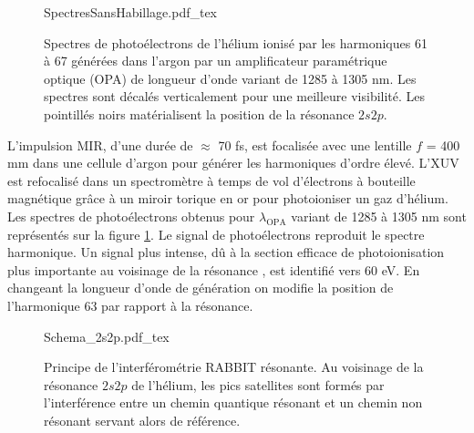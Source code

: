 \begin{figure} [ht]
\centering
\def\svgwidth{\textwidth}
{SpectresSansHabillage.pdf_tex}
\caption{Spectres de photoélectrons de l'hélium ionisé par les harmoniques 61 à 67 générées dans l'argon par un amplificateur paramétrique optique (OPA) de longueur d'onde variant de 1285 à 1305 nm. Les spectres sont décalés verticalement pour une meilleure visibilité. Les pointillés noirs matérialisent la position de la résonance $2s2p$.}
\label{fig:SpectresSansHabillageHe}
\end{figure}

L'impulsion MIR, d'une durée de $\approx$ 70 fs, est focalisée avec une lentille $f$ = 400 mm dans une cellule d'argon pour générer les harmoniques d'ordre élevé. L'XUV est refocalisé dans un spectromètre à temps de vol d'électrons à bouteille magnétique grâce à un miroir torique en or pour photoioniser un gaz d'hélium. Les spectres de photoélectrons obtenus pour $\lambda_{\text{OPA}}$ variant de 1285 à 1305 nm sont représentés sur la figure \ref{fig:SpectresSansHabillageHe}. Le signal de photoélectrons reproduit le spectre harmonique. Un signal plus intense, dû à la section efficace de photoionisation plus importante au voisinage de la résonance , est identifié vers 60 eV. En changeant la longueur d'onde de génération on modifie la position de l'harmonique 63 par rapport à la résonance. 

\begin{figure}[ht]
\centering
\def\svgwidth{0.45\textwidth}
{Schema_2s2p.pdf_tex}
\caption{Principe de l'interférométrie RABBIT résonante. Au voisinage de la résonance $2s2p$ de l'hélium, les pics satellites sont formés par l'interférence entre un chemin quantique résonant et un chemin non résonant servant alors de référence.}
\label{fig:Schema_2s2p}
\end{figure}

